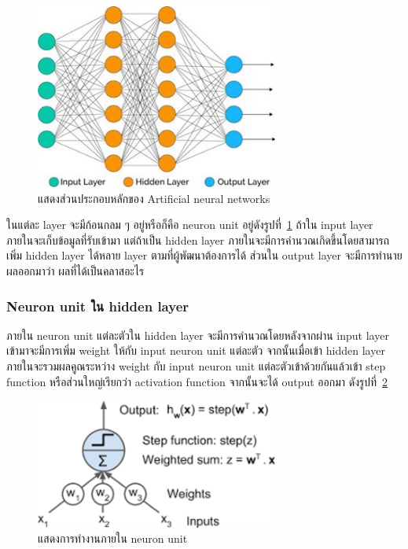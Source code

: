 \documentclass[12pt,oneside,openright,a4paper]{cpe-thai-project}
\begin{document}
\begin{figure}[!h]
  \centering
  \includegraphics[width=8cm]{./image/unit2.jpg}
  \caption{แสดงส่วนประกอบหลักของ Artificial neural networks}
  \label{fig:modelann}
\end{figure}

\par\setlength{\parindent}{5ex}
ในแต่ละ layer จะมีก้อนกลม ๆ อยู่หรือก็คือ neuron unit อยู่ดังรูปที่~\ref{fig:modelann} ถ้าใน input layer ภายในจะเก็บข้อมูลที่รับเข้ามา แต่ถ้าเป็น hidden layer ภายในจะมีการคำนวณเกิดขึ้นโดยสามารถเพิ่ม hidden layer ได้หลาย layer ตามที่ผู้พัฒนาต้องการได้ ส่วนใน output layer จะมีการทำนายผลออกมาว่า ผลที่ได้เป็นคลาสอะไร


\subsubsection{Neuron unit ใน hidden layer}
\par\setlength{\parindent}{5ex}
ภายใน neuron unit แต่ละตัวใน hidden layer จะมีการคำนวณโดยหลังจากผ่าน input layer เข้ามาจะมีการเพิ่ม weight ให้กับ input neuron unit แต่ละตัว จากนั้นเมื่อเข้า hidden layer ภายในจะรวมผลคูณระหว่าง weight กับ input neuron unit แต่ละตัวเข้าด้วยกันแล้วเข้า step function หรือส่วนใหญ่เรียกว่า activation function 
จากนั้นจะได้ output ออกมา ดังรูปที่~\ref{fig:modelNU}

\begin{figure}[!h]
  \centering
  \includegraphics[width=8cm]{./image/neuron_unit.png}
  \caption{แสดงการทำงานภายใน neuron unit \cite{geron2018neura}}
  \label{fig:modelNU}
\end{figure}
\end{document}
